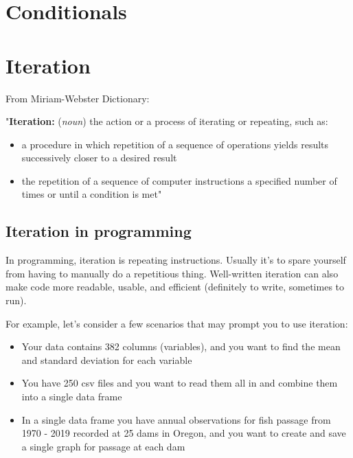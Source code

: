 \documentclass[
]{book}
\providecommand{\tightlist}{%
  \setlength{\itemsep}{0pt}\setlength{\parskip}{0pt}}
\begin{document}
\hypertarget{conditionals}{%
\chapter{Conditionals}\label{conditionals}}

\hypertarget{iteration}{%
\chapter{Iteration}\label{iteration}}

From Miriam-Webster Dictionary:

"\textbf{Iteration:} (\emph{noun}) the action or a process of iterating or repeating, such as:

\begin{itemize}
\tightlist
\item
  a procedure in which repetition of a sequence of operations yields results successively closer to a desired result
\item
  the repetition of a sequence of computer instructions a specified number of times or until a condition is met"
\end{itemize}

\hypertarget{iteration-in-programming}{%
\section{Iteration in programming}\label{iteration-in-programming}}

In programming, iteration is repeating instructions. Usually it's to spare yourself from having to manually do a repetitious thing. Well-written iteration can also make code more readable, usable, and efficient (definitely to write, sometimes to run).

For example, let's consider a few scenarios that may prompt you to use iteration:

\begin{itemize}
\tightlist
\item
  Your data contains 382 columns (variables), and you want to find the mean and standard deviation for each variable
\item
  You have 250 csv files and you want to read them all in and combine them into a single data frame
\item
  In a single data frame you have annual observations for fish passage from 1970 - 2019 recorded at 25 dams in Oregon, and you want to create and save a single graph for passage at each dam
\end{itemize}
\end{document}
